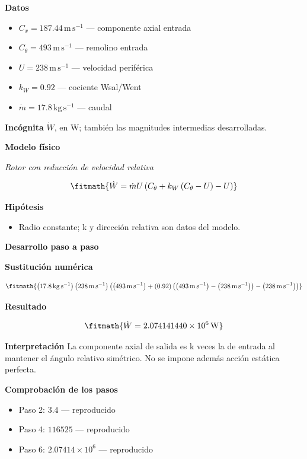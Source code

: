 \documentclass[10pt,openany]{book}
\begin{document}
\noindent\textbf{Datos}
\begin{itemize}
\item $C_x = 187.44\,\mathrm{m}\,\mathrm{s}^{-1}$ — componente axial entrada
\item $C_\theta = 493\,\mathrm{m}\,\mathrm{s}^{-1}$ — remolino entrada
\item $U = 238\,\mathrm{m}\,\mathrm{s}^{-1}$ — velocidad periférica
\item $k_W = 0.92$ — cociente Wsal/Went
\item $\dot m = 17.8\,\mathrm{kg}\,\mathrm{s}^{-1}$ — caudal
\end{itemize}

\noindent\textbf{Incógnita}
$\dot{W}$, en $\mathrm{W}$; también las magnitudes intermedias desarrolladas.

\noindent\textbf{Modelo físico}

\noindent\textit{Rotor con reducción de velocidad relativa}

\[
\fitmath{\dot{W}=\dot m U \left(C_\theta + k_W \left(C_\theta - U\right) - U\right)}
\]

\noindent\textbf{Hipótesis}
\begin{itemize}
\item Radio constante; k y dirección relativa son datos del modelo.
\end{itemize}

\noindent\textbf{Desarrollo paso a paso}



\noindent\textbf{Sustitución numérica}

\[
\fitmath{\left(17.8\,\mathrm{kg}\,\mathrm{s}^{-1}\right) \left(238\,\mathrm{m}\,\mathrm{s}^{-1}\right) \left(\left(493\,\mathrm{m}\,\mathrm{s}^{-1}\right) + \left(0.92\right) \left(\left(493\,\mathrm{m}\,\mathrm{s}^{-1}\right) - \left(238\,\mathrm{m}\,\mathrm{s}^{-1}\right)\right) - \left(238\,\mathrm{m}\,\mathrm{s}^{-1}\right)\right)}
\]

\noindent\textbf{Resultado}

\[
\fitmath{\dot{W}=2.074141440\times10^{6}\,\mathrm{W}}
\]

\noindent\textbf{Interpretación}
La componente axial de salida es k veces la de entrada al mantener el ángulo relativo simétrico. No se impone además acción estática perfecta.

\noindent\textbf{Comprobación de los pasos}
\begin{itemize}
\item Paso 2: $3.4$ — reproducido
\item Paso 4: $116525$ — reproducido
\item Paso 6: $2.07414\times 10^{6}$ — reproducido
\end{itemize}
\end{document}
